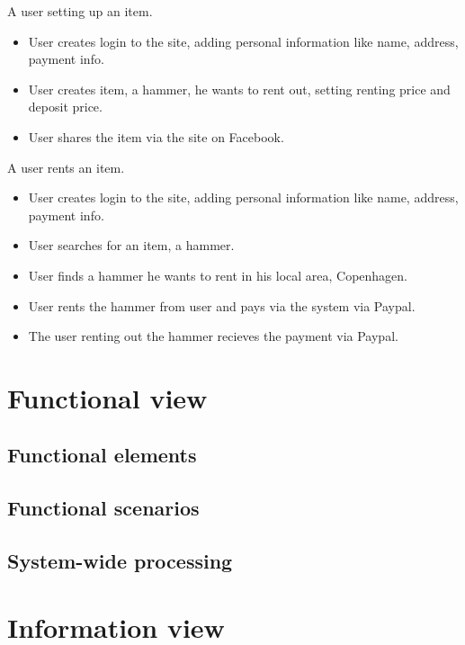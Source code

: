 \documentclass[a4paper,11pt]{report}
\begin{document}
A user setting up an item.
\begin{itemize}
  \item User creates login to the site, adding personal information like name, address, payment info.
  \item User creates item, a hammer, he wants to rent out, setting renting price and deposit price.
  \item User shares the item via the site on Facebook.
\end{itemize}

A user rents an item.
\begin{itemize}
  \item User creates login to the site, adding personal information like name, address, payment info.
  \item User searches for an item, a hammer.
  \item User finds a hammer he wants to rent in his local area, Copenhagen.
  \item User rents the hammer from user and pays via the system via Paypal.
  \item The user renting out the hammer recieves the payment via Paypal.
\end{itemize}

\section{Functional view}
\label{sec:functional-view}


\subsection{Functional elements}
\label{sec:functional-elements}


\subsection{Functional scenarios}
\label{sec:functional-scenarios-1}


\subsection{System-wide processing}
\label{sec:syst-wide-proc}


\section{Information view}
\label{cha:information-view}
\end{document}
